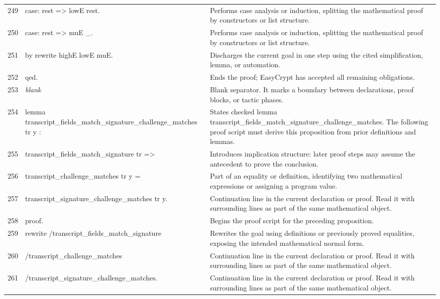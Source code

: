 \documentclass[10pt]{article}
\begin{document}
\begin{longtable}{r L{0.53\textwidth} L{0.37\textwidth}}
249 & {\ttfamily\scriptsize case: rest => lowE rest.} & Performs case analysis or induction, splitting the mathematical proof by constructors or list structure. \\
250 & {\ttfamily\scriptsize case: rest => muE \_.} & Performs case analysis or induction, splitting the mathematical proof by constructors or list structure. \\
251 & {\ttfamily\scriptsize by rewrite highE lowE muE.} & Discharges the current goal in one step using the cited simplification, lemma, or automation. \\
252 & {\ttfamily\scriptsize qed.} & Ends the proof; EasyCrypt has accepted all remaining obligations. \\
253 & {\ttfamily\scriptsize \emph{blank}} & Blank separator.  It marks a boundary between declarations, proof blocks, or tactic phases. \\
254 & {\ttfamily\scriptsize lemma transcript\_fields\_match\_signature\_challenge\_matches tr y :} & States checked lemma transcript\_fields\_match\_signature\_challenge\_matches.  The following proof script must derive this proposition from prior definitions and lemmas. \\
255 & {\ttfamily\scriptsize   transcript\_fields\_match\_signature tr =>} & Introduces implication structure: later proof steps may assume the antecedent to prove the conclusion. \\
256 & {\ttfamily\scriptsize   transcript\_challenge\_matches tr y =} & Part of an equality or definition, identifying two mathematical expressions or assigning a program value. \\
257 & {\ttfamily\scriptsize   transcript\_signature\_challenge\_matches tr y.} & Continuation line in the current declaration or proof.  Read it with surrounding lines as part of the same mathematical object. \\
258 & {\ttfamily\scriptsize proof.} & Begins the proof script for the preceding proposition. \\
259 & {\ttfamily\scriptsize rewrite /transcript\_fields\_match\_signature} & Rewrites the goal using definitions or previously proved equalities, exposing the intended mathematical normal form. \\
260 & {\ttfamily\scriptsize         /transcript\_challenge\_matches} & Continuation line in the current declaration or proof.  Read it with surrounding lines as part of the same mathematical object. \\
261 & {\ttfamily\scriptsize         /transcript\_signature\_challenge\_matches.} & Continuation line in the current declaration or proof.  Read it with surrounding lines as part of the same mathematical object. \\

\end{longtable}
\end{document}
